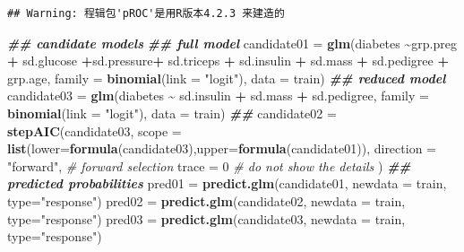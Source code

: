 \documentclass[
]{book}
\newenvironment{Shaded}{\begin{snugshade}}{\end{snugshade}}
\newcommand{\AttributeTok}[1]{\textcolor[rgb]{0.13,0.29,0.53}{#1}}
\newcommand{\CommentTok}[1]{\textcolor[rgb]{0.56,0.35,0.01}{\textit{#1}}}
\newcommand{\DecValTok}[1]{\textcolor[rgb]{0.00,0.00,0.81}{#1}}
\newcommand{\DocumentationTok}[1]{\textcolor[rgb]{0.56,0.35,0.01}{\textbf{\textit{#1}}}}
\newcommand{\FunctionTok}[1]{\textcolor[rgb]{0.13,0.29,0.53}{\textbf{#1}}}
\newcommand{\NormalTok}[1]{#1}
\newcommand{\OtherTok}[1]{\textcolor[rgb]{0.56,0.35,0.01}{#1}}
\newcommand{\SpecialCharTok}[1]{\textcolor[rgb]{0.81,0.36,0.00}{\textbf{#1}}}
\newcommand{\StringTok}[1]{\textcolor[rgb]{0.31,0.60,0.02}{#1}}
\begin{document}
\begin{verbatim}
## Warning: 程辑包'pROC'是用R版本4.2.3 来建造的
\end{verbatim}

\begin{Shaded}
\begin{Highlighting}[]
\DocumentationTok{\#\#  candidate models}
\DocumentationTok{\#\#  full model}
\NormalTok{candidate01 }\OtherTok{=} \FunctionTok{glm}\NormalTok{(diabetes }\SpecialCharTok{\textasciitilde{}}\NormalTok{grp.preg }\SpecialCharTok{+}\NormalTok{ sd.glucose }\SpecialCharTok{+}\NormalTok{sd.pressure}\SpecialCharTok{+}\NormalTok{ sd.triceps }\SpecialCharTok{+}\NormalTok{ sd.insulin }\SpecialCharTok{+} 
\NormalTok{                    sd.mass }\SpecialCharTok{+}\NormalTok{ sd.pedigree }\SpecialCharTok{+}\NormalTok{ grp.age, }\AttributeTok{family =} \FunctionTok{binomial}\NormalTok{(}\AttributeTok{link =} \StringTok{"logit"}\NormalTok{),  }
                    \AttributeTok{data =}\NormalTok{ train)  }
\DocumentationTok{\#\# reduced model}
\NormalTok{candidate03 }\OtherTok{=} \FunctionTok{glm}\NormalTok{(diabetes }\SpecialCharTok{\textasciitilde{}}\NormalTok{ sd.insulin }\SpecialCharTok{+}\NormalTok{ sd.mass }\SpecialCharTok{+}\NormalTok{ sd.pedigree, }
                    \AttributeTok{family =} \FunctionTok{binomial}\NormalTok{(}\AttributeTok{link =} \StringTok{"logit"}\NormalTok{),  }
                    \AttributeTok{data =}\NormalTok{ train) }
\DocumentationTok{\#\# }
\NormalTok{candidate02 }\OtherTok{=} \FunctionTok{stepAIC}\NormalTok{(candidate03, }
                      \AttributeTok{scope =} \FunctionTok{list}\NormalTok{(}\AttributeTok{lower=}\FunctionTok{formula}\NormalTok{(candidate03),}\AttributeTok{upper=}\FunctionTok{formula}\NormalTok{(candidate01)),}
                      \AttributeTok{direction =} \StringTok{"forward"}\NormalTok{,   }\CommentTok{\# forward selection}
                      \AttributeTok{trace =} \DecValTok{0}                \CommentTok{\# do not show the details}
\NormalTok{                      )}
\DocumentationTok{\#\#  predicted probabilities}
\NormalTok{pred01 }\OtherTok{=} \FunctionTok{predict.glm}\NormalTok{(candidate01, }\AttributeTok{newdata =}\NormalTok{ train, }\AttributeTok{type=}\StringTok{"response"}\NormalTok{) }
\NormalTok{pred02 }\OtherTok{=} \FunctionTok{predict.glm}\NormalTok{(candidate02, }\AttributeTok{newdata =}\NormalTok{ train, }\AttributeTok{type=}\StringTok{"response"}\NormalTok{)}
\NormalTok{pred03 }\OtherTok{=} \FunctionTok{predict.glm}\NormalTok{(candidate03, }\AttributeTok{newdata =}\NormalTok{ train, }\AttributeTok{type=}\StringTok{"response"}\NormalTok{)}

\end{Highlighting}
\end{Shaded}
\end{document}
